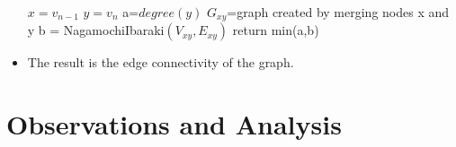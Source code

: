 \documentclass[12pt,letterpaper,titlepage,en-US]{article}
\begin{document}
\begin{itemize}
\begin{algorithm}[H]
\begin{algorithmic}[1]
        \State $x=v_{n-1}$
        \State $y=v_{n}$
        \State a=$degree(y)$
        \State$ G_{xy}$=graph created by merging nodes x and y
        \State b = NagamochiIbaraki$(V_{xy}, E_{xy})$
        \State return min(a,b)
        
     
     
      
        \EndProcedure
    \end{algorithmic}
    \end{algorithm}


\item The result  is the edge connectivity of the graph.

\end{itemize}

\section{Observations and Analysis}
\end{document}
